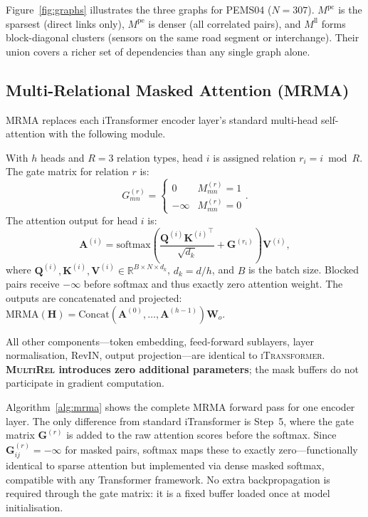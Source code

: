 \documentclass[letterpaper]{article}   %
\newcommand{\mr}{\textsc{MultiRel}}
\newcommand{\itrans}{\textsc{iTransformer}}
\begin{document}
Figure~\ref{fig:graphs} illustrates the three graphs for PEMS04 ($N{=}307$).
$M^{\text{pc}}$ is the sparsest (direct links only), $M^{\text{pe}}$ is denser
(all correlated pairs), and $M^{\text{ll}}$ forms block-diagonal clusters
(sensors on the same road segment or interchange).
Their union covers a richer set of dependencies than any single graph alone.


\subsection{Multi-Relational Masked Attention (MRMA)}

MRMA replaces each iTransformer encoder layer's standard multi-head self-attention
with the following module.

With $h$ heads and $R{=}3$ relation types, head $i$ is assigned relation
$r_i = i\bmod R$.
The gate matrix for relation $r$ is:
\begin{equation}
G^{(r)}_{mn} = \begin{cases}0 & M^{(r)}_{mn}=1\\-\infty & M^{(r)}_{mn}=0\end{cases}.
\end{equation}
The attention output for head $i$ is:
\begin{equation}
\mathbf{A}^{(i)} = \mathrm{softmax}\!\left(
  \frac{\mathbf{Q}^{(i)}{\mathbf{K}^{(i)}}^\top}{\sqrt{d_k}}
  + \mathbf{G}^{(r_i)}\right)\mathbf{V}^{(i)},
\label{eq:mrma}
\end{equation}
where $\mathbf{Q}^{(i)},\mathbf{K}^{(i)},\mathbf{V}^{(i)}\in\mathbb{R}^{B\times N\times d_k}$,
$d_k=d/h$, and $B$ is the batch size.
Blocked pairs receive $-\infty$ before softmax and thus exactly zero attention weight.
The outputs are concatenated and projected: $\mathrm{MRMA}(\mathbf{H})=
\mathrm{Concat}(\mathbf{A}^{(0)},\ldots,\mathbf{A}^{(h-1)})\mathbf{W}_o$.

All other components—token embedding, feed-forward sublayers, layer normalisation,
RevIN, output projection—are identical to \itrans{}.
\textbf{\mr{} introduces zero additional parameters}; the mask buffers do not
participate in gradient computation.


Algorithm~\ref{alg:mrma} shows the complete MRMA forward pass for one encoder layer.
The only difference from standard iTransformer is Step~5, where the gate matrix
$\mathbf{G}^{(r)}$ is added to the raw attention scores before the softmax.
Since $\mathbf{G}^{(r)}_{ij}{=}-\infty$ for masked pairs, softmax maps these to
exactly zero—functionally identical to sparse attention but implemented via
dense masked softmax, compatible with any Transformer framework.
No extra backpropagation is required through the gate matrix: it is a fixed buffer
loaded once at model initialisation.
\end{document}
